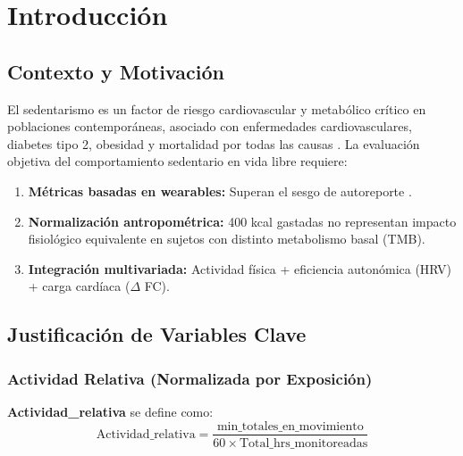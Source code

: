 \documentclass[12pt,a4paper,twoside]{article}
\begin{document}
\newpage
\tableofcontents
\newpage


\section{Introducción}

\subsection{Contexto y Motivación}

El sedentarismo es un factor de riesgo cardiovascular y metabólico crítico en poblaciones contemporáneas, asociado con enfermedades cardiovasculares, diabetes tipo 2, obesidad y mortalidad por todas las causas \citep{Troiano2008,TudorLocke2011}. La evaluación objetiva del comportamiento sedentario en vida libre requiere:

\begin{enumerate}[itemsep=0pt]
    \item \textbf{Métricas basadas en wearables:} Superan el sesgo de autoreporte \citep{Troiano2008}.
    \item \textbf{Normalización antropométrica:} 400 kcal gastadas no representan impacto fisiológico equivalente en sujetos con distinto metabolismo basal (TMB).
    \item \textbf{Integración multivariada:} Actividad física + eficiencia autonómica (HRV) + carga cardíaca ($\Delta$ FC).
\end{enumerate}

\subsection{Justificación de Variables Clave}

\subsubsection{Actividad Relativa (Normalizada por Exposición)}

\begin{definicion}
\textbf{Actividad\_relativa} se define como:
\begin{equation}
\text{Actividad\_relativa} = \frac{\text{min\_totales\_en\_movimiento}}{60 \times \text{Total\_hrs\_monitoreadas}}
\end{equation}
\end{definicion}
\end{document}
